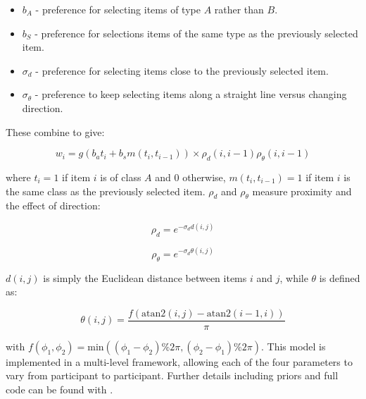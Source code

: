 \documentclass[vision,article,submit,pdftex,moreauthors]{Definitions/mdpi}
\begin{document}
\begin{itemize}
    \item $b_A$ - preference for selecting items of type $A$ rather than $B$.
    \item $b_S$ - preference for selections items of the same type as the previously selected item.
    \item $\sigma_d$ - preference for selecting items close to the previously selected item.
    \item $\sigma_{\theta}$ - preference to keep selecting items along a straight line versus changing direction.
\end{itemize}

These combine to give:

\begin{linenomath}
\begin{equation}
    w_i = g\left(b_at_i + b_sm(t_i, t_{i-1})\right) \times \rho_d(i, i-1) \rho_{\theta}(i, i-1)
\end{equation}
\end{linenomath}

where $t_i = 1$ if item $i$ is of class $A$ and 0 otherwise, $m(t_i, t_{i-1}) =1$ if item $i$ is the same class as the previously selected item. $\rho_d$ and $\rho_{\theta}$ measure proximity and the effect of direction:

\begin{linenomath}
\begin{equation}
    \rho_d = e^{-\sigma_dd(i,j)}
\end{equation}
\end{linenomath}

\begin{linenomath}
\begin{equation}
    \rho_{\theta} = e^{-\sigma_d\theta(i,j)}
\end{equation}
\end{linenomath}

$d(i,j)$ is simply the Euclidean distance between items $i$ and $j$, while $\theta$ is defined as:

\begin{linenomath}
\begin{equation}
    \theta(i,j) = \frac{f(\text{atan2}(i, j) - \text{atan2}(i-1, i))}{\pi}
\end{equation}
\end{linenomath}

with $f(\phi_1, \phi_2) = \text{min}((\phi_1 - \phi_2) \% 2\pi, (\phi_2 - \phi_1) \% 2\pi)$. This model is implemented in a multi-level framework, allowing each of the four parameters to vary from participant to participant. Further details including priors and full code can be found with \cite{clarke2022foraging}.
\end{document}
